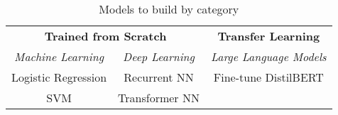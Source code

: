 \begin{table}[!ht]
\centering
\small
	\begin{tabular}{ccc}
		\toprule

		\multicolumn{2}{c}{\textbf{Trained from Scratch}} & \textbf{Transfer Learning}\\
		\cmidrule(r){1-2} \cmidrule(l){3-3}
		\emph{Machine Learning} & \emph{Deep Learning} & \emph{Large Language Models}\\
		\midrule
		Logistic Regression & Recurrent NN & Fine-tune DistilBERT \\
		SVM & Transformer NN & \\
		\bottomrule		
	\end{tabular}
	\caption{Models to build by category}
	\label{table-models-to-build}
\end{table}